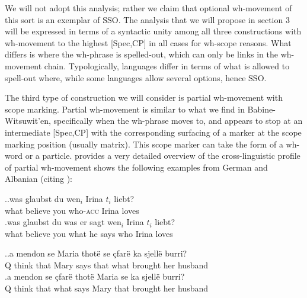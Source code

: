 \documentclass{glossa}
\begin{document}
We will not adopt this analysis; rather we claim that optional wh-movement of this sort is an exemplar of SSO. The analysis that we will propose in section 3 will be expressed in terms of a syntactic unity among all three constructions with wh-movement to the highest [Spec,CP] in all cases for wh-scope reasons. What differs is where the wh-phrase is spelled-out, which can only be links in the wh-movement chain. Typologically, languages differ in terms of what is allowed to spell-out where, while some languages allow several options, hence SSO.

The third type of construction we will consider is partial wh-movement with scope marking. Partial wh-movement is similar to what we find in Babine-Witsuwit'en, specifically when the wh-phrase moves to, and appears to stop at an intermediate [Spec,CP] with the corresponding surfacing of a marker at the scope marking position (usually matrix). This scope marker can take the form of a wh-word or a particle. \cite{fanselow:2006} provides a very detailed overview of the cross-linguistic profile of partial wh-movement shows the following examples from German and Albanian (citing \citealp{turano:1995}):

\ex.\label{wh.250}\ag.\label{wh.250a}was glaubst du wen$_i$ Irina $t_i$ liebt?\\
   what believe you who-\textsc{acc} Irina {} loves\\
   \bg.\label{wh.250b}was glaubst du was er sagt wen$_i$ Irina $t_i$ liebt?\\
   what believe you what he says who Irina loves\\

\ex.\label{wh.260}\ag.\label{wh.260a}a mendon se Maria thot\"e se \c{c}far\"e ka sjell\"e burri?\\
   Q think that Mary says that what brought her husband\\
   \bg.\label{wh.260b}a mendon se \c{c}far\"e thot\"e Maria se ka sjell\"e burri?\\
   Q think that what says Mary that brought her husband\\
\end{document}
